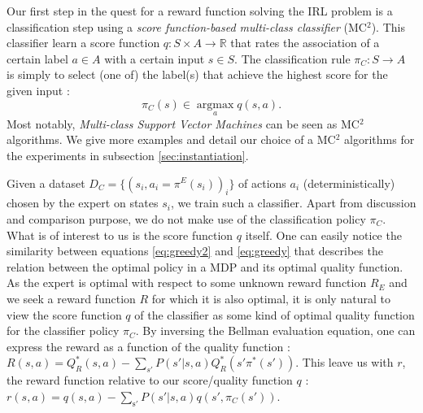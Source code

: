 \documentclass[smallextended]{svjour3}
\newcommand{\argmax}{\operatorname*{argmax}} %
\begin{document}
Our first step in the quest for a reward function solving the IRL problem is a classification step using a \emph{score function-based multi-class classifier} (MC$^2$). This classifier learn a score function $q:S\times A \rightarrow \mathbb{R}$ that rates the association of a certain label $a\in A$ with a certain input $s\in S$. The classification rule $\pi_C: S \rightarrow A$ is simply to select (one of) the label(s) that achieve the highest score for the given input :
\begin{equation}
  \label{eq:greedy2}
\pi_C(s) \in \argmax_a q(s,a).
\end{equation}
Most notably, \emph{Multi-class Support Vector Machines} can be seen as MC$^2$ algorithms. We give more examples and detail our choice of a MC$^2$ algorithms for the experiments in subsection \ref{sec:instantiation}. 

Given a dataset $D_C = \{(s_i,a_i=\pi^E(s_i))_i\}$ of actions $a_i$ (deterministically) chosen by the expert on states $s_i$, we train such a classifier. Apart from discussion and comparison purpose, we do not make use of the classification policy $\pi_C$. What is of interest to us is the score function $q$ itself. One can easily notice the similarity between equations \ref{eq:greedy2} and \ref{eq:greedy} that describes the relation between the optimal policy in a MDP and its optimal quality function. As the expert is optimal with respect to some unknown reward function $R_E$ and we seek a reward function $R$ for which it is also optimal, it is only natural to view the score function $q$ of the classifier as some kind of optimal quality function for the classifier policy $\pi_C$. By inversing the Bellman evaluation equation, one can express the reward as a function of the quality function : $R(s,a) = Q^*_R(s,a) - \sum_{s'}P(s'|s,a)Q^*_R(s'\pi^*(s'))$. This leave us with $r$, the reward function relative to our score/quality function $q$ : $r(s,a) =q(s,a) - \sum_{\mathrm{s'}}P(s'|s,a)q(s',\pi_C(s'))$.
\end{document}
